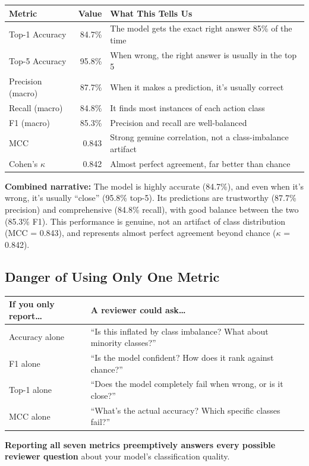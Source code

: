 \documentclass[12pt, a4paper]{article}
\begin{document}
\begin{summarybox}
\begin{center}
\renewcommand{\arraystretch}{1.4}
\begin{tabular}{lrl}
\toprule
\textbf{Metric} & \textbf{Value} & \textbf{What This Tells Us} \\
\midrule
Top-1 Accuracy & 84.7\% & The model gets the exact right answer 85\% of the time \\
Top-5 Accuracy & 95.8\% & When wrong, the right answer is usually in the top 5 \\
Precision (macro) & 87.7\% & When it makes a prediction, it's usually correct \\
Recall (macro) & 84.8\% & It finds most instances of each action class \\
F1 (macro) & 85.3\% & Precision and recall are well-balanced \\
MCC & 0.843 & Strong genuine correlation, not a class-imbalance artifact \\
Cohen's $\kappa$ & 0.842 & Almost perfect agreement, far better than chance \\
\bottomrule
\end{tabular}
\end{center}

\textbf{Combined narrative:} The model is highly accurate (84.7\%), and even when it's wrong, it's usually ``close'' (95.8\% top-5). Its predictions are trustworthy (87.7\% precision) and comprehensive (84.8\% recall), with good balance between the two (85.3\% F1). This performance is genuine, not an artifact of class distribution (MCC = 0.843), and represents almost perfect agreement beyond chance ($\kappa$ = 0.842).
\end{summarybox}

\subsection{Danger of Using Only One Metric}

\begin{warningbox}
\begin{center}
\renewcommand{\arraystretch}{1.3}
\begin{tabular}{p{4cm}p{9cm}}
\toprule
\textbf{If you only report\ldots} & \textbf{A reviewer could ask\ldots} \\
\midrule
Accuracy alone & ``Is this inflated by class imbalance? What about minority classes?'' \\
F1 alone & ``Is the model confident? How does it rank against chance?'' \\
Top-1 alone & ``Does the model completely fail when wrong, or is it close?'' \\
MCC alone & ``What's the actual accuracy? Which specific classes fail?'' \\
\bottomrule
\end{tabular}
\end{center}

\textbf{Reporting all seven metrics preemptively answers every possible reviewer question} about your model's classification quality.
\end{warningbox}
\end{document}
